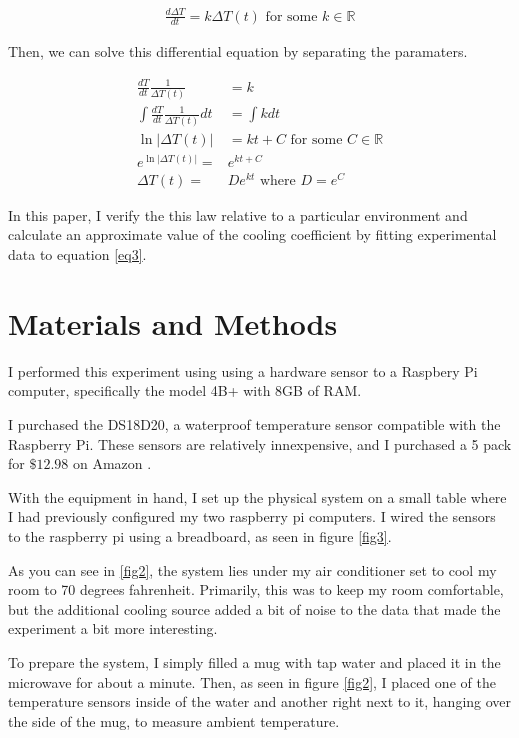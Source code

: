 \documentclass[12pt]{article}
\newcommand{\reals}{\mathbb{R}}
\begin{document}
\begin{align} \label{eq1}
	\frac{d\Delta T}{dt} = k\Delta T(t) \textrm{ for some $k \in \reals$}
\end{align}

Then, we can solve this differential equation by separating the paramaters.

\begin{align} \label{eq2}
	\frac{dT}{dt}\frac{1}{\Delta T(t)} & = k \\
	\int \frac{dT}{dt}\frac{1}{\Delta T(t)} dt & = \int k dt \\
	\ln|\Delta T(t)| & = kt + C \textrm{ for some $C \in \reals$} \\
	e^{\ln | \Delta T(t) | } = & e^{kt + C} \\
	\label{eq3}
	\Delta T(t) = & De^{kt} \textrm{ where $D = e^C$ }
\end{align}

In this paper, I verify the this law
relative to a particular environment
and calculate an approximate value of the cooling coefficient
by fitting experimental data to equation \ref{eq3}.

\section{Materials and Methods}

I performed this experiment using
using a hardware sensor
to a Raspbery Pi computer,
specifically the model 4B+ with 8GB of RAM.

I purchased the DS18D20,
a waterproof temperature sensor compatible with the Raspberry Pi.
These sensors are relatively innexpensive,
and I purchased a 5 pack for $\$12.98$ on Amazon \citep{Amazon}.

With the equipment in hand,
I set up the physical system
on a small table
where I had previously configured
my two raspberry pi computers.
I wired the sensors to the raspberry pi using
a breadboard, as seen in figure \ref{fig3}.

As you can see in \ref{fig2},
the system lies under my air conditioner
set to cool my room to 70 degrees fahrenheit.
Primarily, this was to keep my room comfortable,
but the additional cooling source added
a bit of noise to the data
that made the experiment a bit more interesting.

To prepare the system,
I simply filled a mug with tap water
and placed it in the microwave
for about a minute.
Then, as seen in figure \ref{fig2},
I placed one of the temperature sensors
inside of the water
and another right next to it,
hanging over the side of the mug,
to measure ambient temperature.
\end{document}
